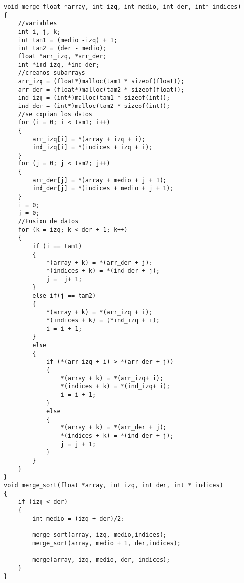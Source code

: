 \begin{lstlisting}
void merge(float *array, int izq, int medio, int der, int* indices)
{
    //variables
    int i, j, k;
    int tam1 = (medio -izq) + 1;
    int tam2 = (der - medio);
    float *arr_izq, *arr_der;
    int *ind_izq, *ind_der;
    //creamos subarrays
    arr_izq = (float*)malloc(tam1 * sizeof(float));
    arr_der = (float*)malloc(tam2 * sizeof(float));
    ind_izq = (int*)malloc(tam1 * sizeof(int));
    ind_der = (int*)malloc(tam2 * sizeof(int));
    //se copian los datos
    for (i = 0; i < tam1; i++)
    {
        arr_izq[i] = *(array + izq + i);
        ind_izq[i] = *(indices + izq + i);
    }
    for (j = 0; j < tam2; j++)
    {
        arr_der[j] = *(array + medio + j + 1);
        ind_der[j] = *(indices + medio + j + 1);
    }
    i = 0;
    j = 0;
    //Fusion de datos
    for (k = izq; k < der + 1; k++)
    {
        if (i == tam1)
        {
            *(array + k) = *(arr_der + j);
            *(indices + k) = *(ind_der + j);
            j =  j+ 1;
        }
        else if(j == tam2)
        {
            *(array + k) = *(arr_izq + i);
            *(indices + k) = (*ind_izq + i);
            i = i + 1;
        }
        else
        {
            if (*(arr_izq + i) > *(arr_der + j))
            {
                *(array + k) = *(arr_izq+ i);
                *(indices + k) = *(ind_izq+ i);
                i = i + 1;
            }
            else
            {
                *(array + k) = *(arr_der + j);
                *(indices + k) = *(ind_der + j);
                j = j + 1;
            }
        }
    }
}
void merge_sort(float *array, int izq, int der, int * indices)
{
    if (izq < der)
    {
        int medio = (izq + der)/2;

        merge_sort(array, izq, medio,indices);
        merge_sort(array, medio + 1, der,indices);
        
        merge(array, izq, medio, der, indices);
    }
}
\end{lstlisting}

